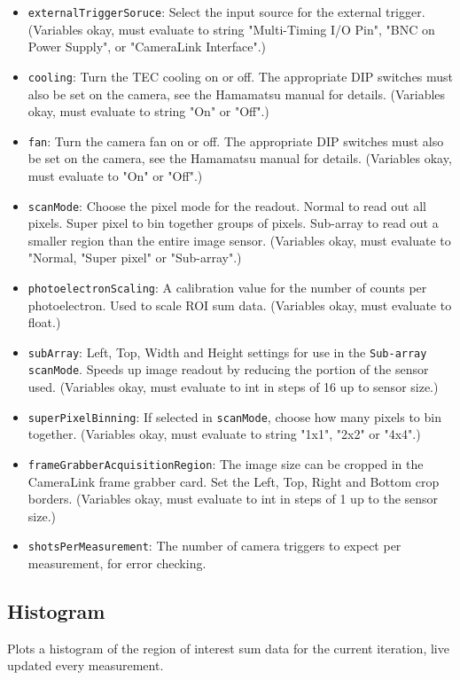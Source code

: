 \documentclass[pdftex,11pt,letterpaper]{article}
\begin{document}
\begin{itemize}
\item \texttt{externalTriggerSoruce}:  Select the input source for the external trigger.  (Variables okay, must evaluate to string "Multi-Timing I/O Pin", "BNC on Power Supply", or "CameraLink Interface".)
\item \texttt{cooling}:  Turn the TEC cooling on or off.  The appropriate DIP switches must also be set on the camera, see the Hamamatsu manual for details.  (Variables okay, must evaluate to string "On" or "Off".)
\item \texttt{fan}:  Turn the camera fan on or off.  The appropriate DIP switches must also be set on the camera, see the Hamamatsu manual for details. (Variables okay, must evaluate to "On" or "Off".)
\item \texttt{scanMode}:  Choose the pixel mode for the readout.  Normal to read out all pixels.  Super pixel to bin together groups of pixels.  Sub-array to read out a smaller region than the entire image sensor.  (Variables okay, must evaluate to "Normal, "Super pixel" or "Sub-array".)
\item \texttt{photoelectronScaling}:  A calibration value for the number of counts per photoelectron.  Used to scale ROI sum data.  (Variables okay, must evaluate to float.)
\item \texttt{subArray}:  Left, Top, Width and Height settings for use in the \texttt{Sub-array} \texttt{scanMode}.  Speeds up image readout by reducing the portion of the sensor used.  (Variables okay, must evaluate to int in steps of 16 up to sensor size.)
\item \texttt{superPixelBinning}:  If selected in \texttt{scanMode}, choose how many pixels to bin together.  (Variables okay, must evaluate to string "1x1", "2x2" or "4x4".)
\item \texttt{frameGrabberAcquisitionRegion}:  The image size can be cropped in the CameraLink frame grabber card.  Set the Left, Top, Right and Bottom crop borders.  (Variables okay, must evaluate to int in steps of 1 up to the sensor size.)
\item \texttt{shotsPerMeasurement}:  The number of camera triggers to expect per measurement, for error checking.
\end{itemize}

\subsection{Histogram}

Plots a histogram of the region of interest sum data for the current iteration, live updated every measurement.
\end{document}
